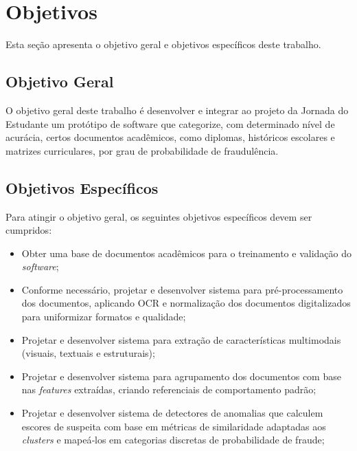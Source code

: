 \section{Objetivos}

Esta seção apresenta o objetivo geral e objetivos específicos deste trabalho.

\subsection{Objetivo Geral}

O objetivo geral deste trabalho é desenvolver e integrar ao projeto da Jornada do Estudante um protótipo de software que categorize, com determinado nível de acurácia, certos documentos acadêmicos, como diplomas, históricos escolares e matrizes curriculares, por grau de probabilidade de fraudulência.

\subsection{Objetivos Específicos}

Para atingir o objetivo geral, os seguintes objetivos específicos devem ser cumpridos:

\begin{itemize}
    \item Obter uma base de documentos acadêmicos para o treinamento e validação do \textit{software};
    \item Conforme necessário, projetar e desenvolver sistema para pré-processamento dos documentos, aplicando OCR e normalização dos documentos digitalizados para uniformizar formatos e qualidade;
    \item Projetar e desenvolver sistema para extração de características multimodais (visuais, textuais e estruturais);
    \item Projetar e desenvolver sistema para agrupamento dos documentos com base nas \textit{features} extraídas, criando referenciais de comportamento padrão;
    \item Projetar e desenvolver sistema de detectores de anomalias que calculem escores de suspeita com base em métricas de similaridade adaptadas aos \textit{clusters} e mapeá‑los em categorias discretas de probabilidade de fraude;
\end{itemize}
